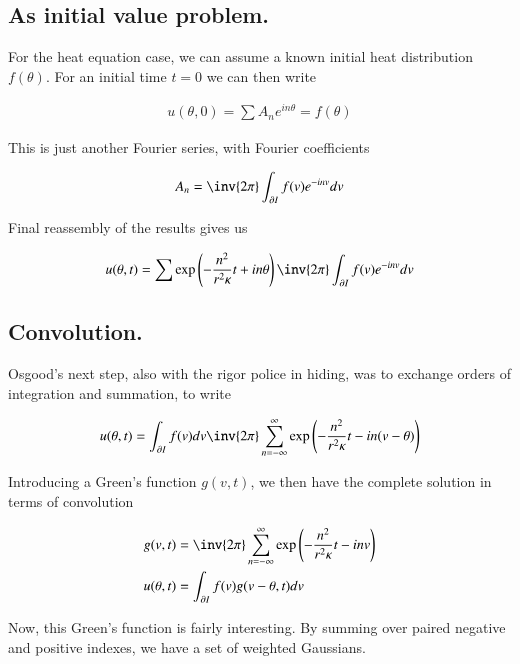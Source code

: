 \subsection{As initial value problem. }

For the heat equation case, we can assume a known initial heat distribution 
$f(\theta)$.
For an initial time $t=0$ we can then write

\begin{align*}
u(\theta, 0) = \sum A_n e^{i n \theta} = f(\theta)
\end{align*}

This is just another Fourier series, with Fourier coefficients

\begin{align*}
A_n = \inv{2\pi} \int_{\partial I} f(v) e^{-i n v} dv
\end{align*}

Final reassembly of the results gives us

\begin{align}
u(\theta, t) = \sum \exp\left(- \frac{n^2}{ r^2 \kappa } t + i n \theta\right) \inv{2\pi} \int_{\partial I} f(v) e^{-i n v} dv
\end{align}

\subsection{Convolution. }

Osgood's next step, also with the rigor police in hiding, was to exchange orders of integration and summation, to write

\begin{align*}
u(\theta, t) 
&= 
\int_{\partial I} f(v) dv \inv{2 \pi} \sum_{n=-\infty}^{\infty} \exp\left(- \frac{n^2}{ r^2 \kappa } t -i n (v -\theta)\right) \\
\end{align*}

Introducing a Green's function $g(v, t)$, we then have the complete solution in terms of convolution

\begin{align}\label{eqn:heat_fourier:seriesGreens}
g( v , t ) &= \inv{2 \pi} \sum_{n=-\infty}^\infty \exp\left(- \frac{n^2}{ r^2 \kappa } t -i n v \right) \\
u(\theta, t) &= \int_{\partial I} f(v) g(v - \theta, t) dv 
\end{align}

Now, this Green's function is fairly interesting.  By summing over paired negative and positive indexes, we have a set of
weighted Gaussians.

